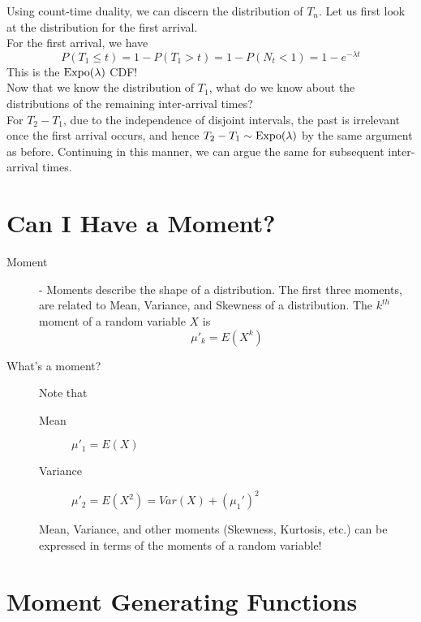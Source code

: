 \documentclass[11.5pt]{article}
\begin{document}
\begin{notes}
Using count-time duality, we can discern the distribution of $T_n$. Let us first look at the distribution for the first arrival. \\
For the first arrival, we have
$$P(T_1 \leq t) = 1 - P(T_1 > t) = 1 - P(N_t < 1) = 1 - e^{-\lambda t}$$
This is the $\textrm{Expo}(\lambda)$ CDF! \\

Now that we know the distribution of $T_1$, what do we know about the distributions of the remaining inter-arrival times?\\

For $T_2 - T_1$, due to the independence of disjoint intervals, the past is irrelevant once the first arrival occurs, and hence $T_2 - T_1 \sim \textrm{Expo}(\lambda)$ by the same argument as before. Continuing in this manner, we can argue the same for subsequent inter-arrival times.

\newpage

\section*{Can I Have a Moment?}
\begin{description}
\item[Moment] - Moments describe the shape of a distribution. The first three moments, are related to Mean, Variance, and Skewness of a distribution. The $k^{th}$ moment of a random variable $X$ is
	\[\mu'_k = E(X^k)\]
\item[What's a moment?] Note that 
	\begin{description}
		\item[Mean] $\mu'_1 = E(X)$
		\item[Variance] $\mu'_2 = E(X^2) = Var(X) + (\mu_1')^2$
	\end{description}
	Mean, Variance, and other moments (Skewness, Kurtosis, etc.) can be expressed in terms of the moments of a random variable!
\end{description}

\section*{Moment Generating Functions}


\end{notes}
\end{document}
